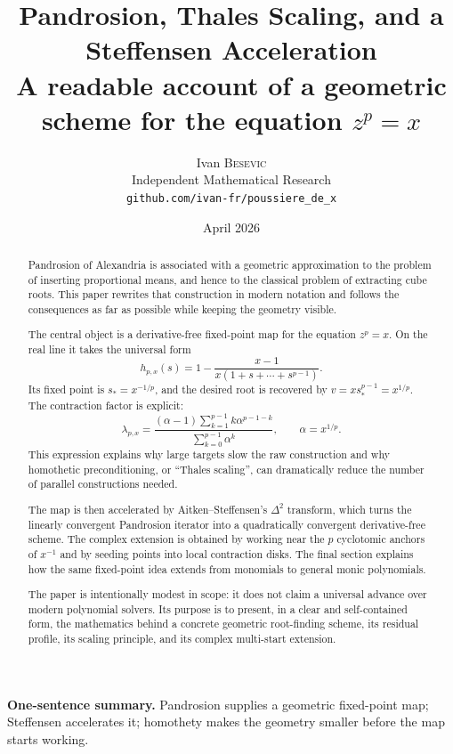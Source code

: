 \documentclass[11pt,a4paper]{article}
\title{\bfseries Pandrosion, Thales Scaling, and a Steffensen Acceleration\\[-0.1em]
\large A readable account of a geometric scheme for the equation $z^p=x$}
\author{Ivan \textsc{Besevic}\\[-0.2em]
\small Independent Mathematical Research\\[-0.2em]
\small \texttt{github.com/ivan-fr/poussiere\_de\_x}}
\date{April 2026}
\theoremstyle{plain}
\theoremstyle{definition}
\theoremstyle{remark}
\newenvironment{takeaway}{%
  \begin{center}\begin{minipage}{0.92\linewidth}\small\itshape\color{blue!45!black}%
}{%
  \end{minipage}\end{center}%
}
\begin{document}
\maketitle

\begin{abstract}
Pandrosion of Alexandria is associated with a geometric approximation to the
problem of inserting proportional means, and hence to the classical problem of
extracting cube roots.  This paper rewrites that construction in modern
notation and follows the consequences as far as possible while keeping the
geometry visible.

The central object is a derivative-free fixed-point map for the equation
$z^p=x$.  On the real line it takes the universal form
\[
  h_{p,x}(s)=1-\frac{x-1}{x(1+s+\cdots+s^{p-1})}.
\]
Its fixed point is $s_*=x^{-1/p}$, and the desired root is recovered by
$v=x s_*^{p-1}=x^{1/p}$.  The contraction factor is explicit:
\[
  \lambda_{p,x}
  =\frac{(\alpha-1)\sum_{k=1}^{p-1}k\alpha^{p-1-k}}
         {\sum_{k=0}^{p-1}\alpha^k},
  \qquad \alpha=x^{1/p}.
\]
This expression explains why large targets slow the raw construction and why
homothetic preconditioning, or ``Thales scaling'', can dramatically reduce the
number of parallel constructions needed.

The map is then accelerated by Aitken--Steffensen's $\Delta^2$ transform,
which turns the linearly convergent Pandrosion iterator into a quadratically
convergent derivative-free scheme.  The complex extension is obtained by
working near the $p$ cyclotomic anchors of $x^{-1}$ and by seeding points into
local contraction disks.  The final section explains how the same fixed-point
idea extends from monomials to general monic polynomials.

The paper is intentionally modest in scope: it does not claim a universal
advance over modern polynomial solvers.  Its purpose is to present, in a clear
and self-contained form, the mathematics behind a concrete geometric
root-finding scheme, its residual profile, its scaling principle, and its
complex multi-start extension.
\end{abstract}

\begin{takeaway}
\textbf{One-sentence summary.}
Pandrosion supplies a geometric fixed-point map; Steffensen accelerates it;
homothety makes the geometry smaller before the map starts working.
\end{takeaway}

\tableofcontents
\newpage
\end{document}
